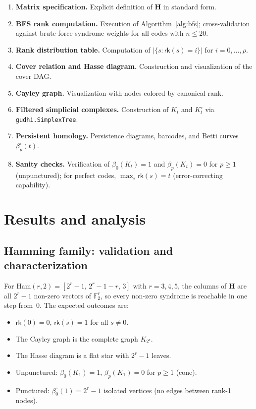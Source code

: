 \documentclass[11pt,twoside,leqno]{article}
\theoremstyle{definition}
\theoremstyle{plain}
\theoremstyle{remark}
\newcommand{\Ftwo}{\mathbb{F}_2}
\newcommand{\rk}{\mathsf{rk}}
\newcommand{\HH}{\mathbf{H}}
\newcommand{\covrad}{\rho}
\begin{document}
\begin{enumerate}[leftmargin=*,label=\textbf{P\arabic*.},itemsep=2pt]
\item \textbf{Matrix specification.} Explicit definition of $\HH$ in standard form.
\item \textbf{BFS rank computation.} Execution of Algorithm~\ref{alg:bfs}; cross-validation
  against brute-force syndrome weights for all codes with $n\le 20$.
\item \textbf{Rank distribution table.} Computation of $|\{s:\rk(s)=i\}|$ for $i=0,\ldots,\covrad$.
\item \textbf{Cover relation and Hasse diagram.} Construction and visualization of the cover DAG.
\item \textbf{Cayley graph.} Visualization with nodes colored by canonical rank.
\item \textbf{Filtered simplicial complexes.} Construction of $K_t$ and $K_t^\circ$ via
  \texttt{gudhi.SimplexTree}.
\item \textbf{Persistent homology.} Persistence diagrams, barcodes, and Betti curves $\beta_p^\circ(t)$.
\item \textbf{Sanity checks.} Verification of $\beta_0(K_t)=1$ and $\beta_p(K_t)=0$ for $p\ge 1$
  (unpunctured); for perfect codes, $\max_s\rk(s)=t$ (error-correcting capability).
\end{enumerate}

\section{Results and analysis}\label{sec:results}

\subsection{Hamming family: validation and characterization}\label{sec:res:hamming}

For $\mathrm{Ham}(r,2)=[2^r-1,\,2^r-1-r,\,3]$ with $r=3,4,5$, the columns of $\HH$ are all
$2^r-1$ non-zero vectors of $\Ftwo^r$, so every non-zero syndrome is reachable in one step from~$0$.
The expected outcomes are:
\begin{itemize}[itemsep=1pt]
  \item $\rk(0)=0$, $\rk(s)=1$ for all $s\ne 0$.
  \item The Cayley graph is the complete graph $K_{2^r}$.
  \item The Hasse diagram is a flat star with $2^r-1$ leaves.
  \item Unpunctured: $\beta_0(K_1)=1$, $\beta_p(K_1)=0$ for $p\ge 1$ (cone).
  \item Punctured: $\beta_0^\circ(1)=2^r-1$ isolated vertices (no edges between rank-1 nodes).
\end{itemize}
\end{document}
